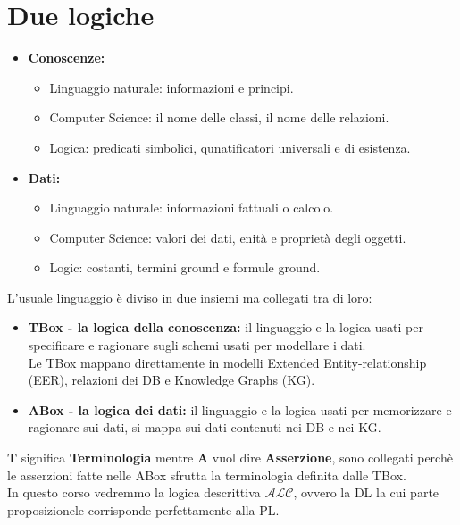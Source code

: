 \documentclass[../main.tex]{subfiles}
\begin{document}
   \section{Due logiche}
   \begin{itemize}
      \item \textbf{Conoscenze:} 
         \begin{itemize}
            \item Linguaggio naturale: informazioni e principi.
            \item Computer Science: il nome delle classi, il nome delle relazioni.
            \item Logica: predicati simbolici, qunatificatori universali e di esistenza.
         \end{itemize} 
      \item \textbf{Dati:}
         \begin{itemize}
            \item Linguaggio naturale: informazioni fattuali o calcolo.
            \item Computer Science: valori dei dati, enità e proprietà degli oggetti.
            \item Logic: costanti, termini ground e formule ground.
         \end{itemize}
   \end{itemize}
   L'usuale linguaggio è diviso in due insiemi ma collegati tra di loro:
   \begin{itemize}
      \item \textbf{TBox - la logica della conoscenza:} il linguaggio e la logica usati per specificare e ragionare sugli schemi usati per modellare i dati.\\
         Le TBox mappano direttamente in modelli Extended Entity-relationship (EER), relazioni dei DB e Knowledge Graphs (KG).
      \item \textbf{ABox - la logica dei dati:} il linguaggio e la logica usati per memorizzare e ragionare sui dati, si mappa sui dati contenuti nei DB e nei KG.
   \end{itemize}
   \textbf{T} significa \textbf{Terminologia} mentre \textbf{A} vuol dire \textbf{Asserzione}, sono collegati perchè le asserzioni fatte nelle ABox sfrutta la terminologia definita dalle TBox.\\
   In questo corso vedremmo la logica descrittiva $\mathcal{ALC}$, ovvero la DL la cui parte proposizionele corrisponde perfettamente alla PL.
\end{document}
